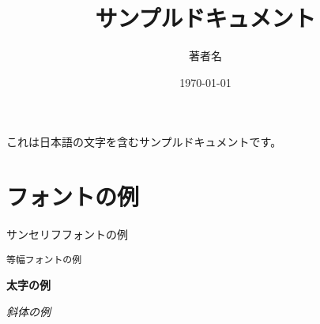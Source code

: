 \documentclass{article}
\title{サンプルドキュメント}
\author{著者名}
\date{\today}
\begin{document}
\maketitle
これは日本語の文字を含むサンプルドキュメントです。
\section{フォントの例}

\textsf{サンセリフフォントの例}

\texttt{等幅フォントの例}

\textbf{太字の例}

\textit{斜体の例}
\end{document}

